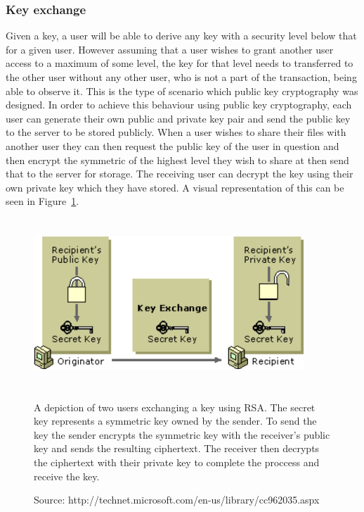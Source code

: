 \documentclass[12pt, titlepage]{article}
\begin{document}
\subsubsection{Key exchange}
Given a key, a user will be able to derive any key with a security level below that for a given user. However assuming that a user wishes to grant another user access to a maximum of some level, the key for that level needs to transferred to the other user without any other user, who is not a part of the transaction, being able to observe it. This is the type of scenario which public key cryptography was designed. In order to achieve this behaviour using public key cryptography, each user can generate their own public and private key pair and send the public key to the server to be stored publicly. When a user wishes to share their files with another user they can then request the public key of the user in question and then encrypt the symmetric of the highest level they wish to share at then send that to the server for storage. The receiving user can decrypt the key using their own private key which they have stored.
\newline \indent A visual representation of this can be seen in Figure~\ref{fig:rsaKeyExchange}.

\begin{figure}
\centerline{\includegraphics[height=2.5in,width=4in,angle=0]{images/rsaKeyExchange.pdf}}
\caption[Caption for LOF]{A depiction of two users exchanging a key using RSA. The secret key represents a symmetric key owned by the sender. To send the key the sender encrypts the symmetric key with the receiver's public key and sends the resulting ciphertext. The receiver then decrypts the ciphertext with their private key to complete the proccess and receive the key.}
\label{fig:rsaKeyExchange}
 \caption*{Source: http://technet.microsoft.com/en-us/library/cc962035.aspx}
\end{figure}
\end{document}

